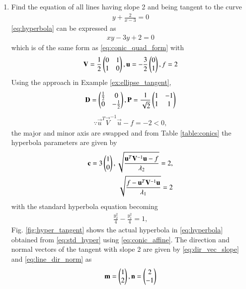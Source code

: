 \renewcommand{\theequation}{\theenumi}
\begin{enumerate}[label=\thesection.\arabic*.,ref=\thesection.\theenumi]
\item 
Find the equation of all lines having slope 2 and being tangent to the curve 
\begin{align}
\label{eq:hyperbola}
y + \frac{2}{x-3} = 0
\end{align}
\solution 
\eqref{eq:hyperbola} can be expressed as
\begin{align}
\label{eq:conic_nofrac}
xy -3y + 2 = 0
\end{align}
which is of the same form as \eqref{eq:conic_quad_form} with 
\begin{align}
\label{eq:hyper_quad_form_param}
\mathbf{V} = \frac{1}{2}\begin{pmatrix}0 & 1\\ 1 & 0\end{pmatrix}, \mathbf{u} = -\frac{3}{2}\begin{pmatrix}0 \\1\end{pmatrix}, f = 2
\end{align}
Using the approach in Example \ref{ex:ellipse_tangent},
\begin{align}
\mathbf{D} = \begin{pmatrix}\frac{1}{2} & 0 \\ 0 & -\frac{1}{2}\end{pmatrix}, \mathbf{P} = \frac{1}{\sqrt{2}}\begin{pmatrix}1 & -1\\1 & 1\end{pmatrix}
\end{align}
\begin{align}
\because \vec{u}^T\vec{V}^{-1}\vec{u}-f = -2 < 0,
\end{align} 
the major and minor axis are swapped and from Table \ref{table:conics}
the hyperbola parameters are given by 
\begin{align}
\mathbf{c}= 3\begin{pmatrix}1\\0\end{pmatrix},
\sqrt{\frac{\mathbf{u}^T\mathbf{V}^{-1}\mathbf{u}-f}{\lambda_2}} = 2,
\\
\sqrt{\frac{f-\mathbf{u}^T\mathbf{V}^{-1}\mathbf{u}}{\lambda_1}} = 2
\end{align}
with the standard hyperbola equation becoming
\begin{align}
\frac{y_2^2}{4}-\frac{y_1^2}{4} = 1,
\label{eq:std_hyper}
\end{align}
%
Fig. \ref{fig:hyper_tangent}	shows  the actual hyperbola in \eqref{eq:hyperbola}  obtained from  
\eqref{eq:std_hyper}  using \eqref{eq:conic_affine}.  
The direction and normal vectors of the tangent with slope 2 are given by \eqref{eq:dir_vec_slope} and \eqref{eq:line_dir_norm} as
\begin{align}
\vec{m} = \myvec{1\\2}, \vec{n} = \myvec{2\\-1}

\end{align}
\end{enumerate}
